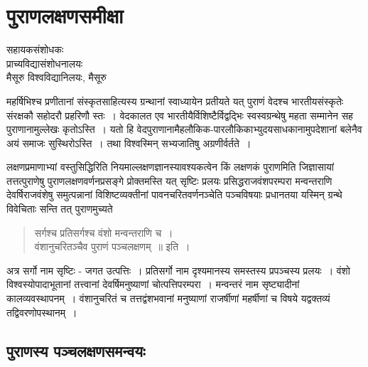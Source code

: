 {\fontsize{15}{17}\selectfont
\presetvalues
\chapter{पुराणलक्षणसमीक्षा}

\begin{center}
\smallskip

सहायकसंशोधकः\\
प्राच्यविद्यासंशोधनालयः\\
मैसूरु विश्वविद्यानिलयः, मैसूरु
\addrule
\end{center}

महर्षिभिश्च प्रणीतानां संस्कृतसाहित्यस्य ग्रन्थानां स्वाध्यायेन प्रतीयते यत् पुराणं वेदश्च भारतीयसंस्कृतेः संरक्षकौ सहोदरौ प्रहरिणौ स्तः~। वेदकालत एव भारतीयैर्विशिष्टैर्विद्वद्भिः स्व\-स्वग्रन्थेषु महता सम्मानेन सह पुराणानामुल्लेखः कृतोऽस्ति~। यतो हि वेदपुराणानामैहलौकिक-पारलौकिकाभ्युदयसाधकानामुपदेशानां बलेनैव अयं समाजः सुस्थिरोऽस्ति~। तथा विश्वस्मिन् सभ्यजातिषु अग्रणीर्वर्तते~। 

लक्षणप्रमाणाभ्यां वस्तुसिद्धिरिति नियमाल्लक्षणज्ञानस्यावश्यकत्वेन किं लक्षणकं पुराणमिति जिज्ञासायां तत्तत्पुराणेषु पुराणलक्षणवर्णनप्रसङ्गे प्रोक्तमस्ति यत् सृष्टिः प्रलयः प्रसिद्ध\-राजवंशपरम्परा मन्वन्तराणि देवर्षिराजवंशेषु समुत्पन्नानां विशिष्टव्यक्तीनां पावनचरितवर्णनञ्चेति पञ्चविषयाः प्रधानतया यस्मिन् ग्रन्थे विवेचिताः सन्ति तत् पुराणमुच्यते 
\begin{verse}
सर्गश्च प्रतिसर्गश्च वंशो मन्वन्तराणि च~। \\
वंशानुचरितञ्चैव पुराणं पञ्चलक्षणम्~॥ इति~। 
\end{verse}
अत्र सर्गो नाम सृष्टिः - जगत उत्पत्तिः~। प्रतिसर्गो नाम दृश्यमानस्य समस्तस्य प्रपञ्चस्य प्रलयः~। वंशो विश्वस्योपादाभूतानां तत्त्वानां देवर्षिमनुष्याणां चोत्पत्तिपरम्परा~। मन्वन्तरं नाम सृष्ट्यादीनां कालव्यवस्थापनम्~। वंशानुचरितं च तत्तद्वंशभवानां मनुष्याणां राजर्षीणां महर्षीणां च विषये यद्वक्तव्यं तद्विवरणोपस्थानम्~। 

\section*{पुराणस्य पञ्चलक्षणसमन्वयः}

}
